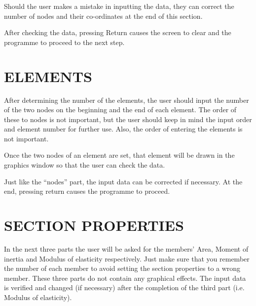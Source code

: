 \documentclass{article}
\begin{document}
	Should the user makes a mistake in inputting the data, they can correct the number of nodes and their co-ordinates at the end of this section.
	
	After checking the data, pressing Return causes the screen to clear and the programme to proceed to the next step.
\section{ELEMENTS}
After determining the number of the elements, the user should input the number of the two nodes on the beginning and the end of each element. The order of these to nodes is not important, but the user should keep in mind the input order and element number for further use. Also, the order of entering the elements is not important.
	
	Once the two nodes of an element are set, that element will be drawn in the graphics window so that the user can check the data.
	
	Just like the “nodes” part, the input data can be corrected if necessary. At the end, pressing return causes the programme to proceed.
\section{SECTION PROPERTIES}	
In the next three parts the user will be asked for the members’ Area, Moment of inertia and Modulus of elasticity respectively. Just make sure that you remember the number of each member to avoid setting the section properties to a wrong member.
	These three parts do not contain any graphical effects.
	The input data is verified and changed (if necessary) after the completion of the third part (i.e. Modulus of elasticity).
\end{document}
